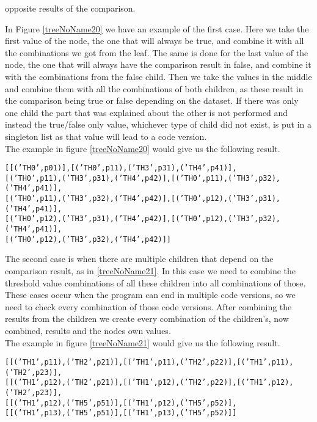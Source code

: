 opposite results of the comparison. 

In Figure \ref{treeNoName20} we have an example of the first case. Here we take the first
value of the node, the one that will always be true, and combine it with all
the combinations we got from the leaf. The same is done for the last value of
the node, the one that will always have the comparison result in false, and combine it with
the combinations from the false child. Then we take the values in the middle
and combine them with all the combinations of both children, as these result in
the comparison being true or false depending on the dataset. If there was only
one child the part that was explained about the other is not performed and
instead the true/false only value, whichever type of child did not exist, is
put in a singleton list as that value will lead to a code version.\\
The example in figure \ref{treeNoName20} would give us the following result.\vspace{1em}

{\centering
  \texttt{[[('TH0',p01)],[('TH0',p11),('TH3',p31),('TH4',p41)],}\\
  \texttt{[('TH0',p11),('TH3',p31),('TH4',p42)],[('TH0',p11),('TH3',p32),('TH4',p41)],}\\
  \texttt{[('TH0',p11),('TH3',p32),('TH4',p42)],[('TH0',p12),('TH3',p31),('TH4',p41)],}\\
  \texttt{[('TH0',p12),('TH3',p31),('TH4',p42)],[('TH0',p12),('TH3',p32),('TH4',p41)],}\\
  \hspace{10em}\texttt{[('TH0',p12),('TH3',p32),('TH4',p42)]]}
}
\vspace{1em}

The second case is when 
there are multiple children that depend on the comparison result, as in
\ref{treeNoName21}. In this case we need to combine the threshold value
combinations of all these children into all combinations of those. These cases
occur when the program can end in multiple code versions, so we need to check
every combination of those code versions. After combining the results from the
children we create every combination of the children's, now combined, results
and the nodes own values. \\
The example in figure \ref{treeNoName21} would give us the following result.\vspace{1em}

{\centering
  \texttt{[[('TH1',p11),('TH2',p21)],[('TH1',p11),('TH2',p22)],[('TH1',p11),('TH2',p23)],}\\
  \texttt{[[('TH1',p12),('TH2',p21)],[('TH1',p12),('TH2',p22)],[('TH1',p12),('TH2',p23)],}\\
  \texttt{[[('TH1',p12),('TH5',p51)],[('TH1',p12),('TH5',p52)],}\\
  \texttt{[[('TH1',p13),('TH5',p51)],[('TH1',p13),('TH5',p52)]]}\\
}


